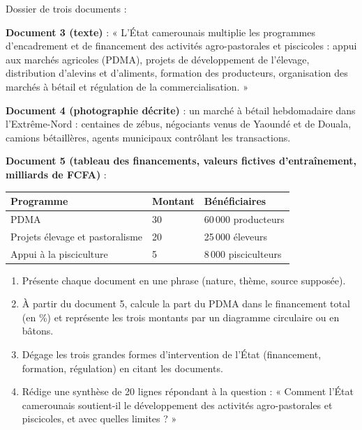 \documentclass[11pt]{article}
\begin{document}
\begin{exercice}
Dossier de trois documents :

\textbf{Document 3 (texte)} : « L'État camerounais multiplie les programmes d'encadrement et de financement des activités agro-pastorales et piscicoles : appui aux marchés agricoles (PDMA), projets de développement de l'élevage, distribution d'alevins et d'aliments, formation des producteurs, organisation des marchés à bétail et régulation de la commercialisation. »

\textbf{Document 4 (photographie décrite)} : un marché à bétail hebdomadaire dans l'Extrême-Nord : centaines de zébus, négociants venus de Yaoundé et de Douala, camions bétaillères, agents municipaux contrôlant les transactions.

\textbf{Document 5 (tableau des financements, valeurs fictives d'entraînement, milliards de FCFA)} :

\begin{center}
\begin{tabularx}{\linewidth}{|l|X|X|}\hline
\rowcolor{popblueL} \textbf{Programme} & \textbf{Montant} & \textbf{Bénéficiaires} \\ \hline
PDMA & 30 & 60\,000 producteurs \\ \hline
Projets élevage et pastoralisme & 20 & 25\,000 éleveurs \\ \hline
Appui à la pisciculture & 5 & 8\,000 pisciculteurs \\ \hline
\end{tabularx}
\end{center}

\begin{enumerate}
\item Présente chaque document en une phrase (nature, thème, source supposée).
\item À partir du document 5, calcule la part du PDMA dans le financement total (en \%) et représente les trois montants par un diagramme circulaire ou en bâtons.
\item Dégage les trois grandes formes d'intervention de l'État (financement, formation, régulation) en citant les documents.
\item Rédige une synthèse de 20 lignes répondant à la question : « Comment l'État camerounais soutient-il le développement des activités agro-pastorales et piscicoles, et avec quelles limites ? »
\end{enumerate}
\end{exercice}
\end{document}
